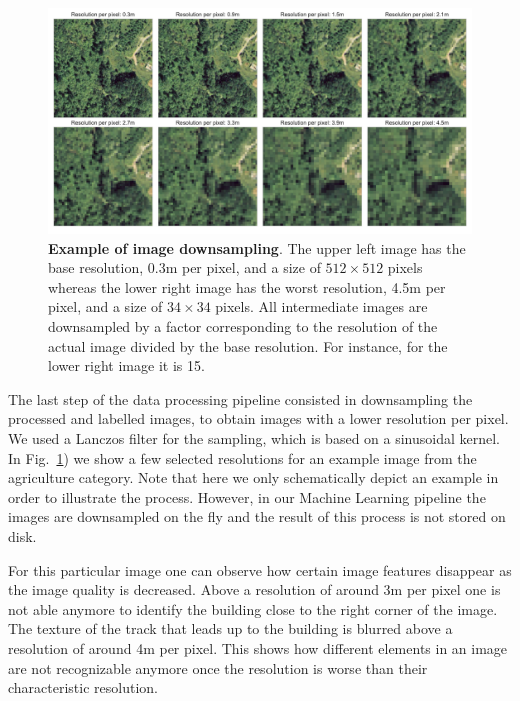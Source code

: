\begin{figure}[h!]
	\centering
	\captionsetup{width=1\linewidth}
	\includegraphics[width=1\textwidth]{Figures/demo_degrade.pdf}
	\caption{\textbf{Example of image downsampling}. The upper left image has the base resolution, 0.3m per pixel, and a size of $512\times512$ pixels whereas the lower right image has the worst resolution, 4.5m per pixel, and a size of $34\times34$ pixels. All intermediate images are downsampled by a factor corresponding to the resolution of the actual image divided by the base resolution. For instance, for the lower right image it is 15.}
	\label{fig:degrade}
\end{figure}

The last step of the data processing pipeline consisted in downsampling the processed and labelled images, to obtain images with a lower resolution per pixel. We used a Lanczos filter \parencite{duchon1979} for the sampling, which is based on a sinusoidal kernel. In Fig.~\ref{fig:degrade}) we show a few selected resolutions for an example image from the agriculture category. Note that here we only schematically depict an example in order to illustrate the process. However, in our Machine Learning pipeline the images are downsampled on the fly and the result of this process is not stored on disk.

For this particular image one can observe how certain image features disappear as the image quality is decreased. Above a resolution of around 3m per pixel one is not able anymore to identify the building close to the right corner of the image. 
The texture of the track that leads up to the building is blurred above a resolution of around 4m per pixel. This shows how different elements in an image are not recognizable anymore once the resolution is worse than their characteristic resolution.



